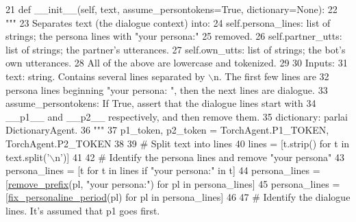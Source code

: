 \begin{DoxyCode}
21     \textcolor{keyword}{def }\_\_init\_\_(self, text, assume\_persontokens=True, dictionary=None):
22         \textcolor{stringliteral}{"""}
23 \textcolor{stringliteral}{        Separates text (the dialogue context) into:}
24 \textcolor{stringliteral}{          self.persona\_lines: list of strings; the persona lines with "your persona:"}
25 \textcolor{stringliteral}{            removed.}
26 \textcolor{stringliteral}{          self.partner\_utts: list of strings; the partner's utterances.}
27 \textcolor{stringliteral}{          self.own\_utts: list of strings; the bot's own utterances.}
28 \textcolor{stringliteral}{        All of the above are lowercase and tokenized.}
29 \textcolor{stringliteral}{}
30 \textcolor{stringliteral}{        Inputs:}
31 \textcolor{stringliteral}{          text: string. Contains several lines separated by \(\backslash\)n. The first few lines are}
32 \textcolor{stringliteral}{            persona lines beginning "your persona: ", then the next lines are dialogue.}
33 \textcolor{stringliteral}{          assume\_persontokens: If True, assert that the dialogue lines start with}
34 \textcolor{stringliteral}{            \_\_p1\_\_ and \_\_p2\_\_ respectively, and then remove them.}
35 \textcolor{stringliteral}{          dictionary: parlai DictionaryAgent.}
36 \textcolor{stringliteral}{        """}
37         p1\_token, p2\_token = TorchAgent.P1\_TOKEN, TorchAgent.P2\_TOKEN
38 
39         \textcolor{comment}{# Split text into lines}
40         lines = [t.strip() \textcolor{keywordflow}{for} t \textcolor{keywordflow}{in} text.split(\textcolor{stringliteral}{'\(\backslash\)n'})]
41 
42         \textcolor{comment}{# Identify the persona lines and remove "your persona"}
43         persona\_lines = [t \textcolor{keywordflow}{for} t \textcolor{keywordflow}{in} lines \textcolor{keywordflow}{if} \textcolor{stringliteral}{"your persona:"} \textcolor{keywordflow}{in} t]
44         persona\_lines = [\hyperlink{namespaceprojects_1_1controllable__dialogue_1_1controllable__seq2seq_1_1util_accba1ac2dc7bedf184abe7d46120861c}{remove\_prefix}(pl, \textcolor{stringliteral}{"your persona:"}) \textcolor{keywordflow}{for} pl \textcolor{keywordflow}{in} persona\_lines]
45         persona\_lines = [\hyperlink{namespaceprojects_1_1controllable__dialogue_1_1controllable__seq2seq_1_1util_a21f7e685d288dffc51d76664b3f31859}{fix\_personaline\_period}(pl) \textcolor{keywordflow}{for} pl \textcolor{keywordflow}{in} persona\_lines]
46 
47         \textcolor{comment}{# Identify the dialogue lines. It's assumed that p1 goes first.}

\end{DoxyCode}
